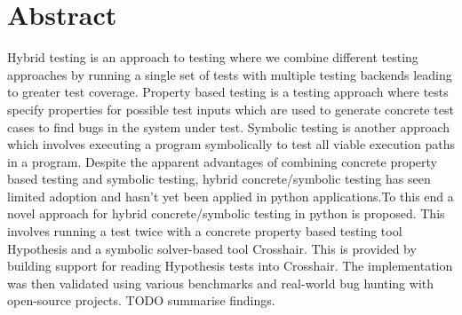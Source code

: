 \chapter*{Abstract}
\vspace{-1em}
Hybrid testing is an approach to testing where we combine different testing approaches by running a single set of tests with multiple testing backends leading to greater test coverage. Property based testing is a testing approach where tests specify properties for possible test inputs which are used to generate concrete test cases to find bugs in the system under test. Symbolic testing is another approach which involves executing a program symbolically to test all viable execution paths in a program. Despite the apparent advantages of combining concrete property based testing and symbolic testing, hybrid concrete/symbolic testing has seen limited adoption and hasn’t yet been applied in python applications.To this end a novel approach for hybrid concrete/symbolic testing in python is proposed. This involves running a test twice with a concrete property based testing tool Hypothesis and a symbolic solver-based tool Crosshair. This is provided by building support for reading Hypothesis tests into Crosshair. The implementation was then validated using various benchmarks and real-world bug hunting with open-source projects. TODO summarise findings.



